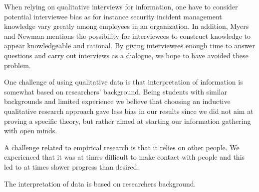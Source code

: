 When relying on qualitative interviews for information, one have to consider potential interviewee bias as for instance security incident management knowledge vary greatly among employees in an organization. In addition, Myers and Newman mentions the possibility for interviewees to construct knowledge to appear knowledgeable and rational. By giving interviewees enough time to answer questions and carry out interviews as a dialogue, we hope to have avoided these problem.

One challenge of using qualitative data is that interpretation of information is somewhat based on researchers' background. Being students with similar backgrounds and limited experience we believe that choosing an inductive qualitative research approach gave less bias in our results since we did not aim at proving a specific theory, but rather aimed at starting our information gathering with open minds. 

A challenge related to empirical research is that it relies on other people. We experienced that it was at times difficult to make contact with people and this led to at times slower progress than desired.

The interpretation of data is based on researchers background.


